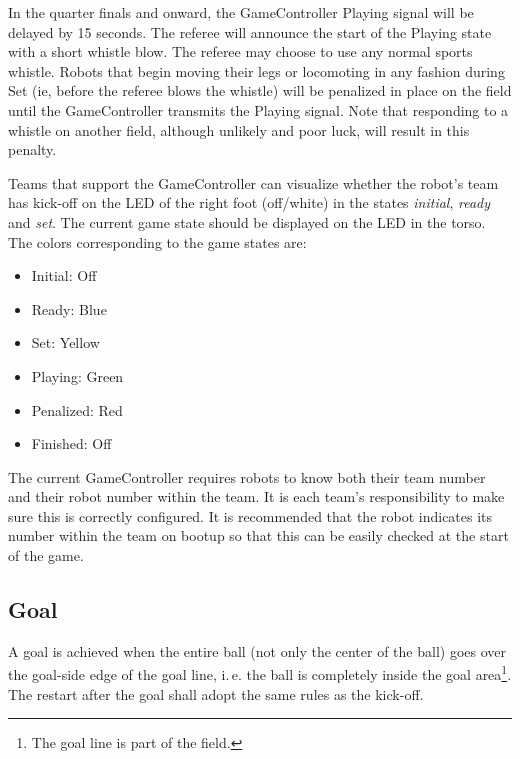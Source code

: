 \documentclass[12pt]{article}
\newcommand{\ie}{\mbox{i.\,e.}\xspace}
\begin{document}
In the quarter finals and onward, the GameController Playing signal will be delayed by 15 seconds.  The referee will announce the start of the Playing state with a short whistle blow.  The referee may choose to use any normal sports whistle.  Robots that begin moving their legs or locomoting in any fashion during Set (ie, before the referee blows the whistle) will be penalized in place on the field until the GameController transmits the Playing signal.  Note that responding to a whistle on another field, although unlikely and poor luck, will result in this penalty.

Teams that support the GameController can visualize whether the robot's team has kick-off on the LED of the right foot (off/white) in the states \emph{initial}, \emph{ready} and \emph{set}. The current game state should be displayed on the LED in the torso. The colors corresponding to the game states are:

\begin{itemize}

\item Initial: Off

\item Ready: Blue

\item Set: Yellow

\item Playing: Green

\item Penalized: Red

\item Finished: Off

\end{itemize}

The current GameController requires robots to know both their team number and their robot number within the team. It is each team's responsibility to make sure this is correctly configured. It is recommended that the robot indicates its number within the team on bootup so that this can be easily checked at the start of the game.

\subsection{Goal}
\label{sec:goal}
A goal is achieved when the entire ball (not only the center of the ball) goes over the goal-side edge of the goal line, \ie the ball is completely inside the goal area\footnote{The goal line is part of the field.}. The restart after the goal shall adopt the same rules as the kick-off.
\end{document}
